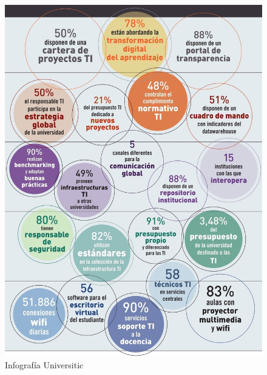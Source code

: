 \begin{figure}[h]
  \centering
  \includegraphics[width=0.9\linewidth]{figures/images/resumen_universitic.jpg}
  \caption{Infografía Universitic}
  \label{fig:infounitic}
\end{figure}


